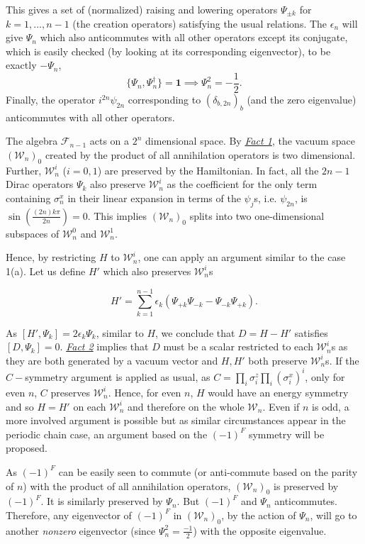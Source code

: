 \documentclass[twoside,11pt,titlepage]{amsart}
\renewcommand{\=}[1]{\stackrel{#1}{=}} %
\theoremstyle{definition}
\theoremstyle{remark}
\begin{document}
This gives a set of (normalized) raising and lowering operators $\Psi_{\pm k}$ for $k=1,\ldots,n-1$ (the creation operators) satisfying the usual relations. The $\epsilon_{n}$ will give $\Psi_n$ which also anticommutes with all other operators except its conjugate, which is easily checked (by looking at its corresponding eigenvector), to be exactly $-\Psi_n$,
$$\{\Psi_n,\Psi_n^\dagger\}=\textbf{1} \implies \Psi_n^2=-\frac{1}{2}.$$
Finally, the operator $i^{2n}\psi_{2n}$ corresponding to $(\delta_{b,2n})_b$ (and the zero eigenvalue) anticommutes with all other operators.

The algebra $\mathcal{F}_{n-1}$ acts on a $2^n$ dimensional space. By \hyperref[fct1]{\textit{Fact 1}}, the vacuum space $(\mathcal{W}_n)_0$ created by the product of all annihilation operators is two dimensional. Further, $\mathcal{W}_n^i$ ($i=0,1$) are preserved by the Hamiltonian. In fact, all the $2n-1$ Dirac operators $\Psi_k$ also preserve $\mathcal{W}_n^i$ as the coefficient for the only term containing $\sigma_n^x$ in their linear expansion in terms of the $\psi_j$s, i.e. $\psi_{2n}$, is $\sin(\frac{(2n)k \pi}{2n})=0$. This implies $(\mathcal{W}_n)_0$ splits into two one-dimensional subspaces of $\mathcal{W}_n^0$ and $\mathcal{W}_n^1$.

Hence, by restricting $H$ to $\mathcal{W}_n^i$, one can apply an argument similar to the case 1(a). Let us define $H'$ which also preserves $\mathcal{W}_n^i$s

$$H'=\sum_{k=1}^{n-1} \epsilon_k(\Psi_{+k}\Psi_{-k}-\Psi_{-k}\Psi_{+k}).$$

As $[H',\Psi_k]=2\epsilon_k\Psi_k$, similar to $H$, we conclude that $D=H-H'$ satisfies $[D,\Psi_k]=0$. \hyperref[fct2]{\textit{Fact 2}} implies that $D$ must be a scalar restricted to each $\mathcal{W}_n^i$s as they are both generated by a vacuum vector and $H,H'$ both preserve $\mathcal{W}_n^i$s. If the $C-$symmetry argument is applied as usual, as $C=\prod_i \sigma_i^z \prod_i (\sigma_i^x)^i$, only for even $n$, $C$ preserves $\mathcal{W}_n^i$. Hence, for even $n$, $H$ would have an energy symmetry and so $H=H'$ on each $\mathcal{W}_n^i$ and therefore on the whole $\mathcal{W}_n$. Even if $n$ is odd, a more involved argument is possible but as similar circumstances appear in the periodic chain case, an argument based on the $(-1)^F$ symmetry will be proposed.

As $(-1)^F$ can be easily seen to commute (or anti-commute based on the parity of $n$) with the product of all annihilation operators, $(\mathcal{W}_n)_0$ is preserved by $(-1)^F$. It is similarly preserved by $\Psi_n$. But $(-1)^F$ and $\Psi_n$ anticommutes. Therefore, any eigenvector of $(-1)^F$ in $(\mathcal{W}_n)_0$, by the action of $\Psi_n$, will go to another \textit{nonzero} eigenvector (since $\Psi_n^2=\frac{-1}{2}$) with the opposite eigenvalue.
\end{document}
